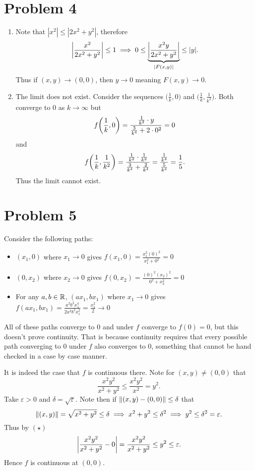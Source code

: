 \documentclass{eeleyes}
\newcommand\eps{\varepsilon}
\begin{document}
\section*{Problem 4}
\begin{enumerate}[label=\alph*)]
    \item Note that $|x^2| \leq |2x^2 + y^2|$, therefore
        \[
            \qty|\frac{x^2}{2x^2 + y^2}| \leq 1 \implies 0 \leq \underbrace{\qty|\frac{x^2 y}{2x^2 + y^2}|}_{|F(x,y)|} \leq |y|
        .\]
        Thus if $(x,y) \to (0,0)$, then $y \to 0$ meaning $F(x,y) \to 0$.
    \item The limit does not exist. Consider the sequences $\bigl(\frac{1}{k}, 0\bigr)$ and $\bigl(\frac{1}{k}, \frac{1}{k^2}\bigr)$. Both converge to $0$ as $k \to \infty$ but
        \[
            f\qty(\frac{1}{k}, 0) = \frac{\frac{1}{k^2} \cdot y}{\frac{3}{k^4} + 2\cdot 0^2} = 0
        \]
        and
        \[
            f\qty(\frac{1}{k}, \frac{1}{k^2}) = \frac{\frac{1}{k^2} \cdot \frac{1}{k^2}}{\frac{3}{k^4} + \frac{2}{k^4}} = \frac{\frac{1}{k^4}}{\frac{5}{k^4}} = \frac{1}{5}
        .\]
        Thus the limit cannot exist.
\end{enumerate}

\section*{Problem 5}
Consider the following paths:
\begin{itemize}
    \item $(x_1, 0)$ where $x_1 \to 0$ gives $f(x_1, 0) = \frac{x_1^2 (0)^2}{x_1^2 + 0^2} = 0$
    \item $(0, x_2)$ where $x_2 \to 0$ gives $f(0, x_2) = \frac{(0)^2 (x_2)^2}{0^2 + x_2^2} = 0$
    \item For any $a, b \in \mathbb{R}$, $(a x_1, b x_1)$ where $x_1 \to 0$ gives $f(a x_1, b x_1) = \frac{a^2 b^2 x_1^4}{2a^2 b^2 x_1^2} = \frac{x_1^2}{2} \to 0$
\end{itemize}

All of these paths converge to $0$ and under $f$ converge to $f(0) = 0$, but this doesn't prove continuity. That is because continuity requires that every possible path converging to $0$ under $f$ also converges to $0$, something that cannot be hand checked in a case by case manner. 

It is indeed the case that $f$ is continuous there. Note for $(x,y) \neq (0,0)$ that
\[
    \frac{x^2 y^2}{x^2 + y^2} \leq \frac{x^2 y^2}{x^2} = y^2 \tag{\star}
.\]
Take $\eps > 0$ and $\delta = \sqrt{\eps}$. Note then if $\norm{(x,y) - (0,0)} \leq \delta$ that
\[
    \norm{(x,y)} = \sqrt{x^2 + y^2} \leq \delta \implies x^2 + y^2 \leq \delta^2 \implies y^2 \leq \delta^2 = \eps
.\]
Thus by $(\star)$
\[
    \qty|\frac{x^2 y^2}{x^2 + y^2} - 0| = \frac{x^2 y^2}{x^2 + y^2} \leq y^2 \leq \eps
.\]
Hence $f$ is continuous at $(0, 0)$.
\end{document}
